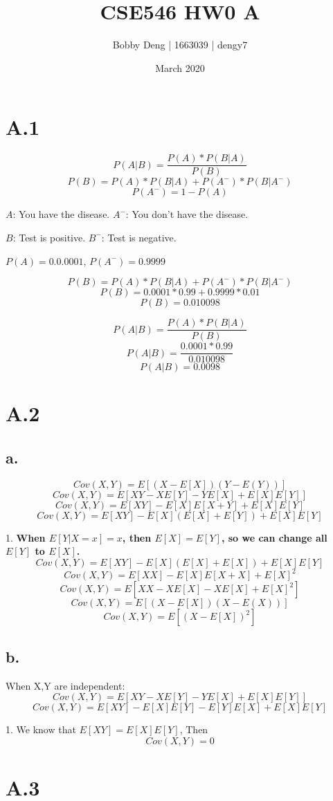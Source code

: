 \documentclass{article}
\title{CSE546 HW0 A}
\author{Bobby Deng | 1663039 | dengy7 }
\date{March 2020}
\begin{document}
\maketitle

\section{A.1}

\[ P(A|B)=\frac{P(A)*P(B|A)}{P(B)} \]
\[ P(B)=P(A)*P(B|A)+P(A^-)*P(B|A^-) \]
\[ P(A^-)=1-P(A)\]

$A$: You have the disease. $A^-$: You don't have the disease.

$B$: Test is positive. $B^-$: Test is negative.

$P(A)=0.0.0001$, $P(A^-)=0.9999$

\[ P(B)= P(A)*P(B|A)+P(A^-)*P(B|A^-) \]
\[ P(B)= 0.0001*0.99+0.9999*0.01 \]
\[ P(B)= 0.010098 \]

\[ P(A|B)=\frac{P(A)*P(B|A)}{P(B)} \]
\[ P(A|B)=\frac{0.0001*0.99}{0.010098} \]
\[ P(A|B)=0.0098 \]


\section{A.2}
\subsection{a.}
\[ Cov(X,Y)=E[(X-E[X])(Y-E(Y))] \]
\[ Cov(X,Y)=E[XY-XE[Y]-YE[X]+E[X]E[Y]] \]
\[ Cov(X,Y)=E[XY]-E[X]E[X+Y]+E[X]E[Y] \]
\[ Cov(X,Y)=E[XY]-E[X](E[X]+E[Y])+E[X]E[Y] \]
\newline

1. \textbf{When $E[Y|X=x]=x$, then $E[X]=E[Y]$, so we can change all $E[Y]$ to $E[X]$.}
\[ Cov(X,Y)=E[XY]-E[X](E[X]+E[X])+E[X]E[Y] \]
\[ Cov(X,Y)=E[XX]-E[X]E[X+X]+E[X]^2 \]
\[ Cov(X,Y)=E[XX-XE[X]-XE[X]+E[X]^2] \]
\[ Cov(X,Y)=E[(X-E[X])(X-E(X))] \]
\[ Cov(X,Y)=E[(X-E[X])^2] \]

\subsection{b.}
When X,Y are independent:
\[ Cov(X,Y)=E[XY-XE[Y]-YE[X]+E[X]E[Y]] \]
\[ Cov(X,Y)=E[XY]-E[X]E[Y]-E[Y]E[X]+E[X]E[Y] \]\newline

1. We know that $E[XY]=E[X]E[Y]$, Then 
\[ Cov(X,Y)=0 \]

\section{A.3}
\end{document}
